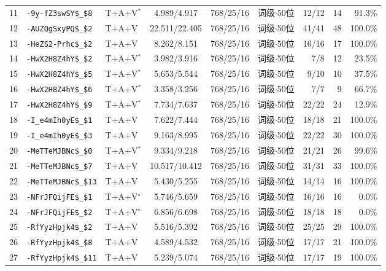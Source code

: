 \begin{longtable}{rllcccrrr}
11 & \texttt{-9y-fZ3swSY\$\_\$8} & T+A+V$^{*}$ & 4.989/4.917 & 768/25/16 & 词级$\cdot$50位 & 12/12 & 14 & 91.3\% \\
12 & \texttt{-AUZQgSxyPQ\$\_\$2} & T+A+V & 22.511/22.405 & 768/25/16 & 词级$\cdot$50位 & 41/41 & 48 & 100.0\% \\
13 & \texttt{-HeZS2-Prhc\$\_\$2} & T+A+V & 8.262/8.151 & 768/25/16 & 词级$\cdot$50位 & 16/16 & 17 & 100.0\% \\
14 & \texttt{-HwX2H8Z4hY\$\_\$2} & T+A+V$^{*}$ & 3.982/3.916 & 768/25/16 & 词级$\cdot$50位 & 7/8 & 12 & 23.5\% \\
15 & \texttt{-HwX2H8Z4hY\$\_\$5} & T+A+V$^{*}$ & 5.653/5.544 & 768/25/16 & 词级$\cdot$50位 & 9/10 & 10 & 37.5\% \\
16 & \texttt{-HwX2H8Z4hY\$\_\$6} & T+A+V$^{*}$ & 3.358/3.256 & 768/25/16 & 词级$\cdot$50位 & 7/7 & 9 & 66.7\% \\
17 & \texttt{-HwX2H8Z4hY\$\_\$9} & T+A+V$^{*}$ & 7.734/7.637 & 768/25/16 & 词级$\cdot$50位 & 22/22 & 24 & 12.9\% \\
18 & \texttt{-I\_e4mIh0yE\$\_\$1} & T+A+V & 7.622/7.444 & 768/25/16 & 词级$\cdot$50位 & 18/18 & 21 & 100.0\% \\
19 & \texttt{-I\_e4mIh0yE\$\_\$3} & T+A+V & 9.163/8.995 & 768/25/16 & 词级$\cdot$50位 & 22/22 & 30 & 100.0\% \\
20 & \texttt{-MeTTeMJBNc\$\_\$0} & T+A+V$^{*}$ & 9.334/9.218 & 768/25/16 & 词级$\cdot$50位 & 21/21 & 26 & 99.6\% \\
21 & \texttt{-MeTTeMJBNc\$\_\$7} & T+A+V & 10.517/10.412 & 768/25/16 & 词级$\cdot$50位 & 31/31 & 33 & 100.0\% \\
22 & \texttt{-MeTTeMJBNc\$\_\$13} & T+A+V & 5.430/5.255 & 768/25/16 & 词级$\cdot$50位 & 14/14 & 16 & 100.0\% \\
23 & \texttt{-NFrJFQijFE\$\_\$1} & T+A+V$^{\circ}$ & 5.746/5.659 & 768/25/16 & 词级$\cdot$50位 & 16/16 & 16 & 0.0\% \\
24 & \texttt{-NFrJFQijFE\$\_\$2} & T+A+V$^{\circ}$ & 6.856/6.698 & 768/25/16 & 词级$\cdot$50位 & 18/18 & 18 & 0.0\% \\
25 & \texttt{-RfYyzHpjk4\$\_\$2} & T+A+V & 5.516/5.392 & 768/25/16 & 词级$\cdot$50位 & 25/25 & 29 & 100.0\% \\
26 & \texttt{-RfYyzHpjk4\$\_\$8} & T+A+V & 4.589/4.532 & 768/25/16 & 词级$\cdot$50位 & 17/17 & 21 & 100.0\% \\
27 & \texttt{-RfYyzHpjk4\$\_\$11} & T+A+V & 5.239/5.074 & 768/25/16 & 词级$\cdot$50位 & 17/17 & 19 & 100.0\% \\

\end{longtable}
